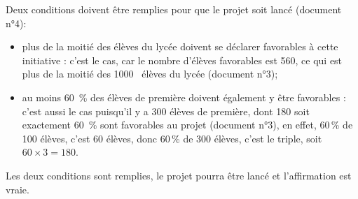 \documentclass[10pt]{article}
\providecommand{\np}[2][]{{#2~#1}}
\begin{document}
	Deux conditions doivent être remplies pour que le projet soit lancé (document n°4):
	\begin{itemize}
		\item plus de la moitié des élèves du lycée doivent se déclarer favorables à cette initiative : c'est le cas, car le nombre d'élèves favorables est 560, ce qui est plus de la moitié des \np{1000} élèves du lycée (document n°3);

		\item au moins 60~\% des élèves de première doivent également y être favorables : c'est aussi le cas puisqu'il y a 300 élèves de première, dont 180 soit exactement 60~\% sont favorables au projet (document n°3), en effet, 60\,\% de 100 élèves, c'est 60 élèves, donc 60\,\% de 300 élèves, c'est le triple, soit $60 \times 3 = 180$.
	\end{itemize}
	Les deux conditions sont remplies, le projet pourra être lancé et l'affirmation est vraie.

\end{document}
